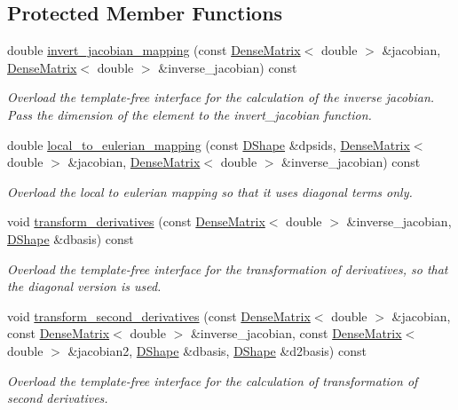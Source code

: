 \subsection*{Protected Member Functions}
\begin{DoxyCompactItemize}
\item 
double \hyperlink{classoomph_1_1DiagQHermiteElement_a07bdc47a91aba325c148acae357b9365}{invert\+\_\+jacobian\+\_\+mapping} (const \hyperlink{classoomph_1_1DenseMatrix}{Dense\+Matrix}$<$ double $>$ \&jacobian, \hyperlink{classoomph_1_1DenseMatrix}{Dense\+Matrix}$<$ double $>$ \&inverse\+\_\+jacobian) const
\begin{DoxyCompactList}\small\item\em Overload the template-\/free interface for the calculation of the inverse jacobian. Pass the dimension of the element to the invert\+\_\+jacobian function. \end{DoxyCompactList}\item 
double \hyperlink{classoomph_1_1DiagQHermiteElement_a0b4a87e67172efe1c68eaac2c7d235a7}{local\+\_\+to\+\_\+eulerian\+\_\+mapping} (const \hyperlink{classoomph_1_1DShape}{D\+Shape} \&dpsids, \hyperlink{classoomph_1_1DenseMatrix}{Dense\+Matrix}$<$ double $>$ \&jacobian, \hyperlink{classoomph_1_1DenseMatrix}{Dense\+Matrix}$<$ double $>$ \&inverse\+\_\+jacobian) const
\begin{DoxyCompactList}\small\item\em Overload the local to eulerian mapping so that it uses diagonal terms only. \end{DoxyCompactList}\item 
void \hyperlink{classoomph_1_1DiagQHermiteElement_abae42df187036728d7d78467509f92af}{transform\+\_\+derivatives} (const \hyperlink{classoomph_1_1DenseMatrix}{Dense\+Matrix}$<$ double $>$ \&inverse\+\_\+jacobian, \hyperlink{classoomph_1_1DShape}{D\+Shape} \&dbasis) const
\begin{DoxyCompactList}\small\item\em Overload the template-\/free interface for the transformation of derivatives, so that the diagonal version is used. \end{DoxyCompactList}\item 
void \hyperlink{classoomph_1_1DiagQHermiteElement_a6d6dbf192bc9284a87608e2699f8ebb1}{transform\+\_\+second\+\_\+derivatives} (const \hyperlink{classoomph_1_1DenseMatrix}{Dense\+Matrix}$<$ double $>$ \&jacobian, const \hyperlink{classoomph_1_1DenseMatrix}{Dense\+Matrix}$<$ double $>$ \&inverse\+\_\+jacobian, const \hyperlink{classoomph_1_1DenseMatrix}{Dense\+Matrix}$<$ double $>$ \&jacobian2, \hyperlink{classoomph_1_1DShape}{D\+Shape} \&dbasis, \hyperlink{classoomph_1_1DShape}{D\+Shape} \&d2basis) const
\begin{DoxyCompactList}\small\item\em Overload the template-\/free interface for the calculation of transformation of second derivatives. \end{DoxyCompactList}\end{DoxyCompactItemize}
